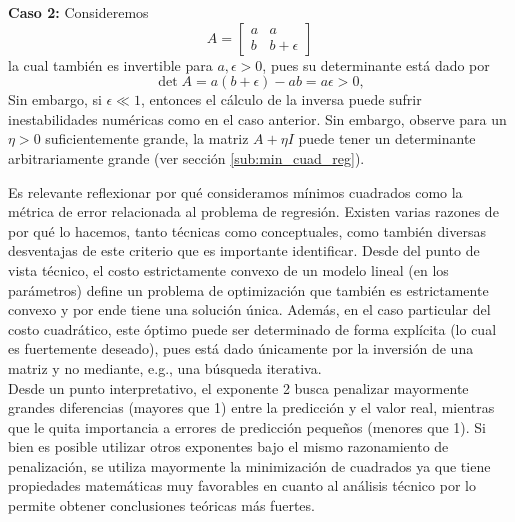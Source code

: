 \begin{mdframed}[style=discusion, frametitle={\center Matriz cuasi-singular o incorrectamente escalada}]
\noindent\textbf{Caso 2:} Consideremos
\begin{equation*}
	A = \left[ \begin{matrix} a  & a \\  b  & b + \epsilon\end{matrix}\right]
\end{equation*}
la cual también es invertible para $a,\epsilon>0$, pues su determinante está dado por
\begin{equation*}
	\det{A} = a(b+\epsilon) - ab = a\epsilon>0,
\end{equation*}
Sin embargo, si $\epsilon\ll1$, entonces el cálculo de la inversa puede sufrir inestabilidades numéricas como en el caso anterior. Sin embargo, observe para un $\eta>0$ suficientemente grande, la matriz $A+\eta I$ puede tener un determinante arbitrariamente grande (ver sección \ref{sub:min_cuad_reg}).
\end{mdframed}

Es relevante reflexionar por qué consideramos mínimos cuadrados como la métrica de error relacionada al problema de regresión. Existen varias razones de por qué lo hacemos, tanto técnicas como conceptuales, como también diversas desventajas de este criterio que es importante identificar.  Desde del punto de vista técnico, el costo estrictamente convexo de un modelo lineal (en los parámetros) define un problema de optimización que también es estrictamente convexo y por ende tiene una solución única. Además, en el caso particular del costo cuadrático, este óptimo puede ser determinado de forma explícita (lo cual es fuertemente deseado), pues está dado únicamente por la inversión de una matriz y no mediante, e.g., una búsqueda iterativa.\\

Desde un punto interpretativo, el exponente 2 busca penalizar mayormente grandes diferencias (mayores que 1) entre la predicción y el valor real, mientras que le quita importancia a errores de predicción pequeños (menores que 1). Si bien es posible utilizar otros exponentes bajo el mismo razonamiento de penalización, se utiliza mayormente la minimización de cuadrados ya que tiene propiedades matemáticas muy favorables en cuanto al análisis técnico por lo permite obtener conclusiones teóricas más fuertes.\\

